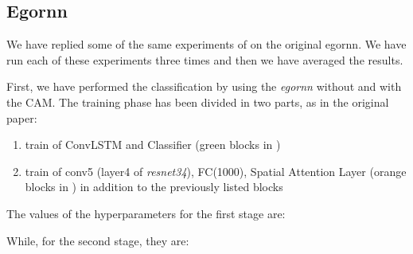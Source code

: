 \documentclass[10pt,twocolumn,hidelinks,letterpaper]{article}
\begin{document}
\subsection{Egornn}

We have replied some of the same experiments of \cite{egornn} on the original egornn. We have run each of these experiments three times and then we have averaged the results.

First, we have performed the classification by using the \textit{egornn} without and with the CAM. The training phase has been divided in two parts, as in the original paper:

\begin{enumerate}
  \item train of ConvLSTM and Classifier (green blocks in )
  \item train of conv5 (layer4 of \textit{resnet34}), FC(1000), Spatial Attention Layer (orange blocks in ) in addition to the previously listed blocks
\end{enumerate}

The values of the hyperparameters for the first stage are:

\begin{center}
\end{center}

While, for the second stage, they are:

\begin{center}
\end{center}
\end{document}
